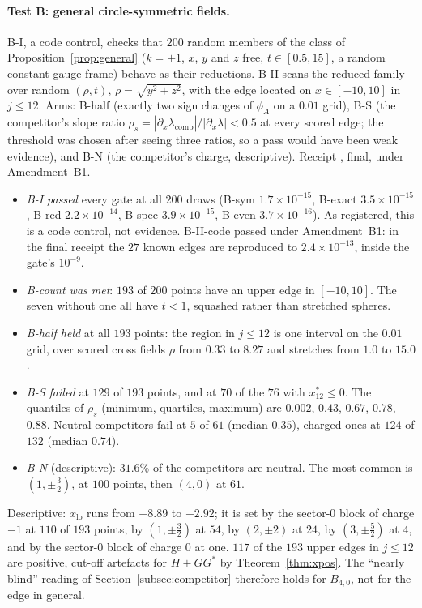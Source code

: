 \documentclass[11pt]{article}
\theoremstyle{definition}
\theoremstyle{remark}
\begin{document}
\paragraph{Test B: general circle-symmetric fields.} B-I, a code control, checks that $200$ random members of the class
of Proposition~\ref{prop:general} ($k=\pm1$, $x$, $y$ and $z$ free, $t\in[0.5,15]$, a random constant gauge frame) behave
as their reductions. B-II scans the reduced family over random $(\rho,t)$, $\rho=\sqrt{y^2+z^2}$, with the edge located
on $x\in[-10,10]$ in $j\le12$. Arms: B-half (exactly two sign changes of $\phi_A$ on a $0.01$ grid), B-S (the
competitor's slope ratio $\rho_s=|\partial_x\lambda_{\mathrm{comp}}|/|\partial_x\lambda|<0.5$ at every scored edge; the
threshold was chosen after seeing three ratios, so a pass would have been weak evidence), and B-N (the competitor's
charge, descriptive). Receipt , final, under Amendment~B1.
\begin{itemize}
  \item \emph{B-I passed} every gate at all $200$ draws (B-sym $1.7\times10^{-15}$, B-exact $3.5\times10^{-15}$, B-red
  $2.2\times10^{-14}$, B-spec $3.9\times10^{-15}$, B-even $3.7\times10^{-16}$). As registered, this is a code control, not
  evidence. B-II-code passed under Amendment~B1: in the final receipt the $27$ known edges are reproduced to $2.4\times10^{-13}$, inside the gate's $10^{-9}$.
  \item \emph{B-count was met}: $193$ of $200$ points have an upper edge in $[-10,10]$. The seven without one all have
  $t<1$, squashed rather than stretched spheres.
  \item \emph{B-half held} at all $193$ points: the region in $j\le12$ is one interval on the $0.01$ grid, over scored
  cross fields $\rho$ from $0.33$ to $8.27$ and stretches from $1.0$ to $15.0$.
  \item \emph{B-S failed} at $129$ of $193$ points, and at $70$ of the $76$ with $x^*_{12}\le0$. The quantiles of $\rho_s$
  (minimum, quartiles, maximum) are $0.002$, $0.43$, $0.67$, $0.78$, $0.88$. Neutral competitors fail at $5$ of $61$
  (median $0.35$), charged ones at $124$ of $132$ (median $0.74$).
  \item \emph{B-N} (descriptive): $31.6\%$ of the competitors are neutral. The most common is $(1,\pm\tfrac32)$, at $100$
  points, then $(4,0)$ at $61$.
\end{itemize}
Descriptive: $x_{\mathrm{lo}}$ runs from $-8.89$ to $-2.92$; it is set by the sector-$0$ block of charge $-1$ at $110$ of
$193$ points, by $(1,\pm\tfrac32)$ at $54$, by $(2,\pm2)$ at $24$, by $(3,\pm\tfrac52)$ at $4$, and by the sector-$0$ block of
charge $0$ at one. $117$ of the $193$ upper edges in $j\le12$ are positive, cut-off artefacts for $H+GG^*$ by
Theorem~\ref{thm:xpos}. The ``nearly blind'' reading of Section~\ref{subsec:competitor} therefore holds for $B_{4,0}$,
not for the edge in general.
\end{document}
